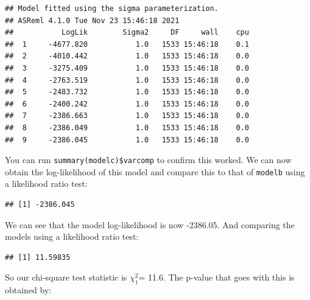 \documentclass[
  12pt,
]{book}
\newenvironment{Shaded}{\begin{snugshade}}{\end{snugshade}}
\newcommand{\DecValTok}[1]{\textcolor[rgb]{0.00,0.00,0.81}{#1}}
\newcommand{\KeywordTok}[1]{\textcolor[rgb]{0.13,0.29,0.53}{\textbf{#1}}}
\newcommand{\NormalTok}[1]{#1}
\newcommand{\OperatorTok}[1]{\textcolor[rgb]{0.81,0.36,0.00}{\textbf{#1}}}
\newcommand{\StringTok}[1]{\textcolor[rgb]{0.31,0.60,0.02}{#1}}
\begin{document}
\begin{verbatim}
## Model fitted using the sigma parameterization.
## ASReml 4.1.0 Tue Nov 23 15:46:18 2021
##           LogLik        Sigma2     DF     wall    cpu
##  1     -4677.820           1.0   1533 15:46:18    0.1
##  2     -4010.442           1.0   1533 15:46:18    0.0
##  3     -3275.409           1.0   1533 15:46:18    0.0
##  4     -2763.519           1.0   1533 15:46:18    0.0
##  5     -2483.732           1.0   1533 15:46:18    0.0
##  6     -2400.242           1.0   1533 15:46:18    0.0
##  7     -2386.663           1.0   1533 15:46:18    0.0
##  8     -2386.049           1.0   1533 15:46:18    0.0
##  9     -2386.045           1.0   1533 15:46:18    0.0
\end{verbatim}

You can run \texttt{summary(modelc)\$varcomp} to confirm this worked. We can now obtain the log-likelihood of this model and compare this to that of \texttt{modelb} using a likelihood ratio test:

\begin{Shaded}
\end{Shaded}

\begin{verbatim}
## [1] -2386.045
\end{verbatim}

We can see that the model log-likelihood is now -2386.05.
And comparing the models using a likelihood ratio test:

\begin{Shaded}
\end{Shaded}

\begin{verbatim}
## [1] 11.59835
\end{verbatim}

So our chi-square test statistic is \(\chi^2_1\)= 11.6.
The p-value that goes with this is obtained by:

\begin{Shaded}
\end{Shaded}
\end{document}
